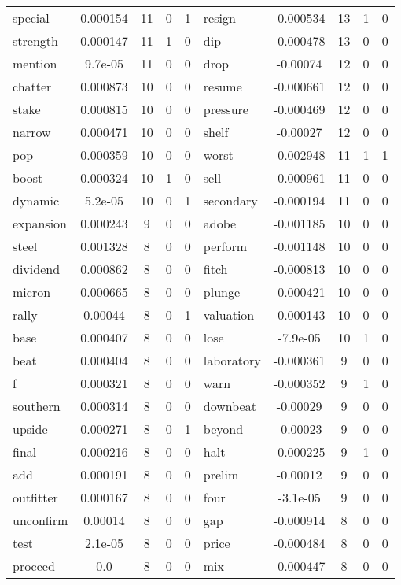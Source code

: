 \documentclass[ oneside,%
                    author={Joshua Felmeden},
                    degree={MEng},
                     title={Sentiment Analysis of Financial Headlines Based on Realised Stock Returns},
                  subtitle={Research}]{dissertation}
\begin{document}
\begin{table}[!ht]
\begin{tabular}{lcccclcccc}
special & 0.000154 & 11 & 0 & 1 & resign & -0.000534 & 13 & 1 & 0 \\
strength & 0.000147 & 11 & 1 & 0 & dip & -0.000478 & 13 & 0 & 0 \\
mention & 9.7e-05 & 11 & 0 & 0 & drop & -0.00074 & 12 & 0 & 0 \\
chatter & 0.000873 & 10 & 0 & 0 & resume & -0.000661 & 12 & 0 & 0 \\
stake & 0.000815 & 10 & 0 & 0 & pressure & -0.000469 & 12 & 0 & 0 \\
narrow & 0.000471 & 10 & 0 & 0 & shelf & -0.00027 & 12 & 0 & 0 \\
pop & 0.000359 & 10 & 0 & 0 & worst & -0.002948 & 11 & 1 & 1 \\
boost & 0.000324 & 10 & 1 & 0 & sell & -0.000961 & 11 & 0 & 0 \\
dynamic & 5.2e-05 & 10 & 0 & 1 & secondary & -0.000194 & 11 & 0 & 0 \\
expansion & 0.000243 & 9 & 0 & 0 & adobe & -0.001185 & 10 & 0 & 0 \\
steel & 0.001328 & 8 & 0 & 0 & perform & -0.001148 & 10 & 0 & 0 \\
dividend & 0.000862 & 8 & 0 & 0 & fitch & -0.000813 & 10 & 0 & 0 \\
micron & 0.000665 & 8 & 0 & 0 & plunge & -0.000421 & 10 & 0 & 0 \\
rally & 0.00044 & 8 & 0 & 1 & valuation & -0.000143 & 10 & 0 & 0 \\
base & 0.000407 & 8 & 0 & 0 & lose & -7.9e-05 & 10 & 1 & 0 \\
beat & 0.000404 & 8 & 0 & 0 & laboratory & -0.000361 & 9 & 0 & 0 \\
f & 0.000321 & 8 & 0 & 0 & warn & -0.000352 & 9 & 1 & 0 \\
southern & 0.000314 & 8 & 0 & 0 & downbeat & -0.00029 & 9 & 0 & 0 \\
upside & 0.000271 & 8 & 0 & 1 & beyond & -0.00023 & 9 & 0 & 0 \\
final & 0.000216 & 8 & 0 & 0 & halt & -0.000225 & 9 & 1 & 0 \\
add & 0.000191 & 8 & 0 & 0 & prelim & -0.00012 & 9 & 0 & 0 \\
outfitter & 0.000167 & 8 & 0 & 0 & four & -3.1e-05 & 9 & 0 & 0 \\
unconfirm & 0.00014 & 8 & 0 & 0 & gap & -0.000914 & 8 & 0 & 0 \\
test & 2.1e-05 & 8 & 0 & 0 & price & -0.000484 & 8 & 0 & 0 \\
proceed & 0.0 & 8 & 0 & 0 & mix & -0.000447 & 8 & 0 & 0 \\

\end{tabular}
\end{table}
\end{document}
